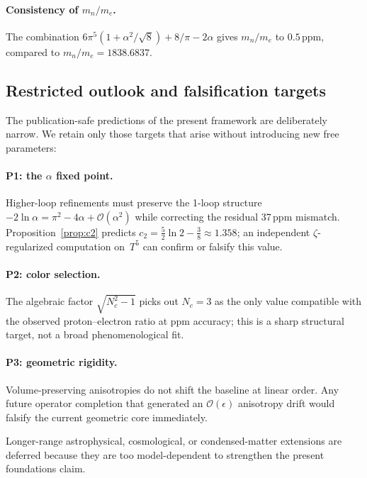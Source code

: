 \documentclass[11pt,a4paper]{article}
\theoremstyle{definition}
\theoremstyle{remark}
\begin{document}
\paragraph{Consistency of $m_n/m_e$.}  The combination
$6\pi^5(1+\alpha^2/\sqrt{8})+8/\pi-2\alpha$ gives $m_n/m_e$ to
$0.5\,\mathrm{ppm}$, compared to $m_n/m_e=1838.6837$.

\subsection{Restricted outlook and falsification targets}

The publication-safe predictions of the present framework are
deliberately narrow.  We retain only those targets that arise without
introducing new free parameters:

\paragraph{P1: the $\alpha$ fixed point.}
Higher-loop refinements must preserve the 1-loop structure
$-2\ln\alpha=\pi^2-4\alpha+\mathcal{O}(\alpha^2)$ while correcting the
residual 37\,ppm mismatch.  Proposition~\ref{prop:c2} predicts
$c_2=\frac{5}{2}\ln 2-\frac{3}{8}\approx 1.358$; an independent
$\zeta$-regularized computation on~$T^5$ can confirm or falsify this
value.

\paragraph{P2: color selection.}
The algebraic factor $\sqrt{N_c^2-1}$ picks out $N_c=3$ as the only
value compatible with the observed proton--electron ratio at ppm
accuracy; this is a sharp structural target, not a broad
phenomenological fit.

\paragraph{P3: geometric rigidity.}
Volume-preserving anisotropies do not shift the baseline at linear order.
Any future operator completion that generated an
$\mathcal{O}(\epsilon)$ anisotropy drift would falsify the current
geometric core immediately.

\noindent Longer-range astrophysical, cosmological, or condensed-matter
extensions are deferred because they are too model-dependent to
strengthen the present foundations claim.

\end{document}
